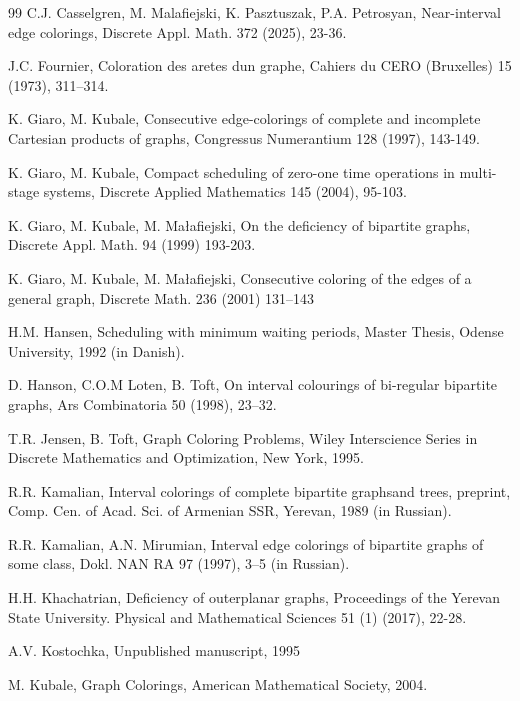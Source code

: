 \documentclass[12pt]{article}
\theoremstyle{plain}
\theoremstyle{definition}
\numberwithin{equation}{section}
\begin{document}
\begin{thebibliography}{99}
C.J. Casselgren, M. Malafiejski, K. Pasztuszak, P.A. Petrosyan, 
Near-interval edge colorings, Discrete Appl. Math. 372 (2025), 23-36.

 J.C. Fournier, Coloration des aretes dun graphe, 
Cahiers du CERO (Bruxelles) 15 (1973), 311--314.

K. Giaro, M. Kubale, Consecutive edge-colorings of complete and incomplete Cartesian products of graphs, Congressus Numerantium 128 (1997), 143-149.

K. Giaro, M. Kubale, Compact scheduling of zero-one time operations in multi-stage systems, Discrete Applied Mathematics 145 (2004), 95-103.

 K. Giaro, M. Kubale, M. Ma\l afiejski, On the deficiency of bipartite graphs, Discrete Appl. Math. 94 (1999) 193-203.

 K. Giaro, M. Kubale, M.  Ma\l afiejski, Consecutive coloring of the
edges of a general graph, Discrete Math. 236 (2001) 131–143

 H.M. Hansen, Scheduling with minimum waiting periods, Master Thesis, Odense University, 1992 (in Danish).

D. Hanson, C.O.M Loten, B. Toft, On interval colourings of bi-regular bipartite graphs, Ars Combinatoria 50 (1998), 23--32.

 T.R. Jensen, B. Toft, Graph Coloring Problems, Wiley Interscience Series in Discrete Mathematics and Optimization, New York, 1995.

 R.R. Kamalian, Interval colorings of complete bipartite graphsand trees, preprint, Comp. Cen. of Acad. Sci. of Armenian SSR, Yerevan, 1989 (in Russian).

 R.R. Kamalian, A.N. Mirumian, Interval edge colorings of bipartite graphs of some class, Dokl. NAN RA 97 (1997), 3--5 (in Russian).

 H.H. Khachatrian, Deficiency of outerplanar graphs, Proceedings of the Yerevan State University. Physical and Mathematical Sciences 51 (1) (2017), 22-28.

A.V. Kostochka, Unpublished manuscript, 1995

 M. Kubale, Graph Colorings, American Mathematical Society, 2004.



\end{thebibliography}
\end{document}
